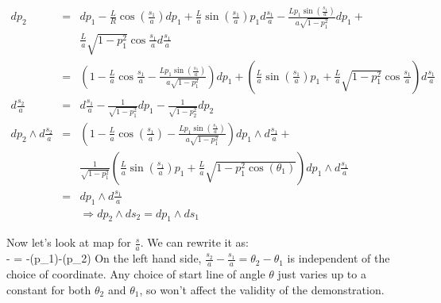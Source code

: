 {\begin{eqnarray}
dp_{2}&=&dp_{1}-\frac{L}{R}\cos(\frac{s_{1}}{a})dp_{1}+\frac{L}{a}\sin(\frac{s_{1}}{a})p_{1}d\frac{s_{1}}{a}-
\frac{Lp_{1}\sin(\frac{s_{1}}{a})}{a\sqrt{1-p_{1}^{2}}}dp_{1}+
\\\nonumber&&\frac{L}{a}\sqrt{1-p_{1}^{2}}\cos{\frac{s_{1}}{a}}d\frac{s_{1}}{a}\\\nonumber
&=&(1-\frac{L}{a}\cos{\frac{s_{1}}{a}}-\frac{Lp_{1}\sin(\frac{s_{1}}{a})}{a\sqrt{1-p_{1}^{2}}})dp_{1}
+(\frac{L}{a}\sin(\frac{s_{1}}{a})p_{1}+\frac{L}{a}\sqrt{1-p_{1}^{2}}\cos{\frac{s_{1}}{a}})d\frac{s_{1}}{a}\\\nonumber
d\frac{s_{2}}{a}&=&d\frac{s_{1}}{a}-\frac{1}{\sqrt{1-p_{1}^{2}}}dp_{1}-\frac{1}{\sqrt{1-p_{2}^{2}}}dp_{2}\\\nonumber
dp_{2}\wedge d\frac{s_{2}}{a}&=& (1-\frac{L}{a}\cos(\frac{s_{1}}{a})-\frac{Lp_{1}\sin(\frac{s_{1}}{a})}{a\sqrt{1-p_{1}^{2}}})dp_{1}{\wedge}d\frac{s_{1}}{a}+\\&&\frac{1}{\sqrt{1-p_{1}^{2}}}(\frac{L}{a}\sin(\frac{s_{1}}{a})p_{1}
+\frac{L}{a}\sqrt{1-p_{1}^{2}\cos(\theta_{1})})dp_{1}\wedge d\frac{s_{1}}{a}\\\nonumber
&=&dp_{1}\wedge d\frac{s_{1}}{a}\\
&&\Rightarrow dp_{2}\wedge ds_{2} = dp_{1}\wedge ds_{1}
\end{eqnarray}

Now let's look at map for $\frac{s}{a}$. We can rewrite it as: 
\\\nonumber \beq {} -  = \pi-\arcsin(p_{1})-\arcsin(p_{2}) \eeq 
On the left hand side, $\frac{s_{2}}{a} - \frac{s_{1}}{a} = \theta_{2}-\theta_{1}$ is independent of the choice of coordinate. Any choice of start line of angle $\theta$ just varies up to a constant for both $\theta_{2}$ and $\theta_{1}$, so won't affect the validity of the demonstration.
 
    }%